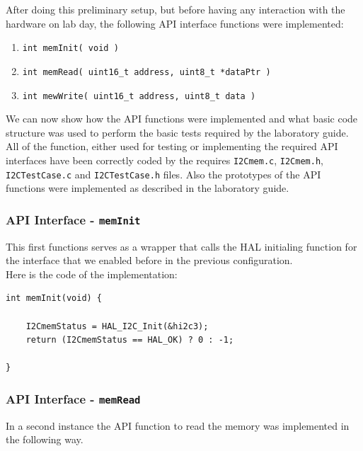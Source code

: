 \documentclass[../main.tex]{subfiles}
\begin{document}
After doing this preliminary setup, but before having any interaction with the hardware on lab day, the following API interface functions were implemented:

\begin{enumerate}[label=\textbf{-}]
	\item \texttt{int memInit( void )}
	\item \texttt{int memRead( uint16\_t address, uint8\_t *dataPtr )}
	\item \texttt{int mewWrite( uint16\_t address, uint8\_t data )}
\end{enumerate}

We can now show how the API functions were implemented and what basic code structure was used to perform the basic tests required by the laboratory guide.\\

All of the function, either used for testing or implementing the required API interfaces have been correctly coded by the requires \texttt{I2Cmem.c}, \texttt{I2Cmem.h}, \texttt{I2CTestCase.c} and \texttt{I2CTestCase.h} files.
Also the prototypes of the API functions were implemented as described in the laboratory guide.

\subsubsection*{API Interface - \texttt{memInit}}

This first functions serves as a wrapper that calls the HAL initialing function for the interface that we enabled before in the previous configuration.\\

Here is the code of the implementation:\\

\begin{lstlisting}
int memInit(void) {

	I2CmemStatus = HAL_I2C_Init(&hi2c3); 
    return (I2CmemStatus == HAL_OK) ? 0 : -1;
    
}

\end{lstlisting}


\subsubsection*{API Interface - \texttt{memRead}}

In a second instance the API function to read the memory was implemented in the following way.\\
\end{document}
